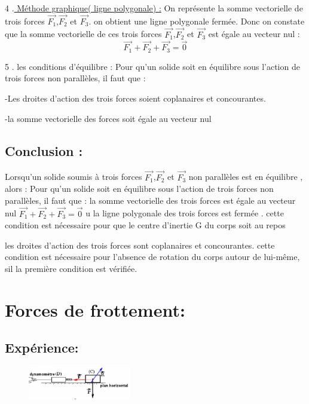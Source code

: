 \documentclass[12pt]{article}
\begin{document}
4 .\underline{ Méthode graphique( ligne polygonale) :} On représente la somme vectorielle de trois forces $\vec{F_1}$,$\vec{F_2}$ et $\vec{F_3}$. on obtient une ligne polygonale
fermée. Donc on constate que la somme vectorielle de ces trois forces $\vec{F_1}$,$\vec{F_2}$ et $\vec{F_3} $ est égale au
vecteur nul : \[\vec{F_1} + \vec{F_2} +  \vec{F_3} = \vec{0} \]

5 . les conditions d’équilibre :  Pour qu’un solide soit en équilibre sous l’action de trois forces non parallèles, il faut que :

-Les droites d’action des trois forces soient coplanaires et concourantes.

-la somme vectorielle des forces soit égale au vecteur nul

\subsection{Conclusion : }
Lorsqu’un solide soumis à trois forces $\vec{F_1}$,$\vec{F_2}$ et $\vec{F_3}$ non parallèles est en équilibre , alors :  
 Pour qu’un solide soit en équilibre sous l’action de trois forces non parallèles, il faut que :
 la somme vectorielle des trois forces est égale au vecteur nul $ \vec{F_1} + \vec{F_2} +  \vec{F_3} = \vec{0}$  u la ligne polygonale des trois forces est fermée . cette condition est nécessaire pour que le centre d’inertie G
du corps soit au repos 

les droites d’action des trois forces sont coplanaires et concourantes. cette condition est nécessaire pour
l’absence de rotation du corps autour de lui-même, sil la première condition est vérifiée.

\section{Forces de frottement:}

\subsection{Expérience: }
\begin{figure}
	\vspace{-3cm}
\includegraphics[width=0.4\textwidth]{./img/addimg.png}
\end{figure}
\end{document}
